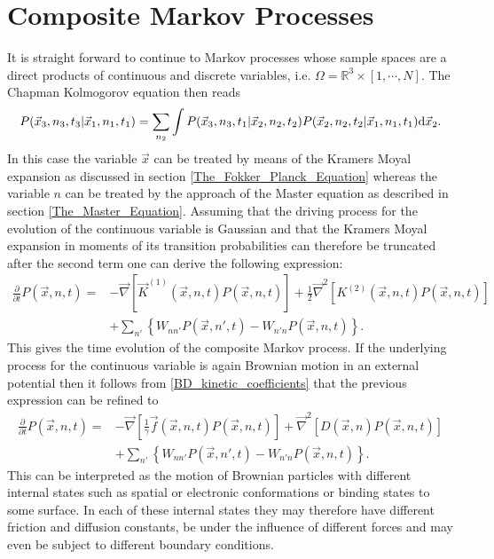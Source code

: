 \section{Composite Markov Processes}
\label{Multivariate_Markov_Processes}
It is straight forward to continue to Markov processes whose sample spaces are a direct products of continuous and discrete variables, i.e. $\Omega = \mathbb{R}^{3} \times [1,\cdots, N]$. The Chapman Kolmogorov equation then reads
\begin{equation}
    P(\vec{x}_3,n_3,t_3|\vec{x}_1,n_1,t_1) = \sum_{n_2} \int P(\vec{x}_3,n_3,t_1|\vec{x}_2,n_2,t_2)P(\vec{x}_2,n_2,t_2|\vec{x}_1,n_1,t_1) {\rm d} \vec{x}_2.
    \label{MCK}
\end{equation}
In this case the variable $\vec{x}$ can be treated by means of the Kramers Moyal expansion as discussed in section \ref{The_Fokker_Planck_Equation} whereas the variable $n$ can be treated by the approach of the Master equation as described in section \ref{The_Master_Equation}. Assuming that the driving process for the evolution of the continuous variable is Gaussian and that the Kramers Moyal expansion in moments of its transition probabilities can therefore be truncated after the second term one can derive the following expression:
\begin{align}
    \frac{\partial}{\partial t } P(\vec{x},n,t) =   &- \vec{ \nabla } \left[\vec{K}^{(1)}(\vec{x},n,t)P(\vec{x},n,t) \right] + \frac{1}{2}\vec{\nabla}^{2}\left[ K^{(2)}(\vec{x},n,t)P(\vec{x},n,t) \right] \nonumber \\
                                                    &+ \sum_{n'} \left\{ W_{nn'}P(\vec{x},n',t) - W_{n'n}P(\vec{x},n,t)\right\}.
    \label{composite_mp}
\end{align}
This gives the time evolution of the composite Markov process. If the underlying process for the continuous variable is again Brownian motion in an external potential then it follows from \eqref{BD_kinetic_coefficients} that the previous expression can be refined to
\begin{align}
    \frac{\partial}{\partial t } P(\vec{x},n,t) =   &- \vec{ \nabla } \left[\frac{1}{\gamma}\vec{f}(\vec{x},n,t)P(\vec{x},n,t) \right] +\vec{\nabla}^{2}\left[ D(\vec{x},n)P(\vec{x},n,t) \right] \nonumber \\
                                                    &+ \sum_{n'} \left\{ W_{nn'}P(\vec{x},n',t) - W_{n'n}P(\vec{x},n,t)\right\}.
    \label{fpmeq1}
\end{align}
This can be interpreted as the motion of Brownian particles with different internal states such as spatial or electronic conformations or binding states to some surface. In each of these internal states they may therefore have different friction and diffusion constants, be under the influence of different forces and may even be subject to different boundary conditions. \\
